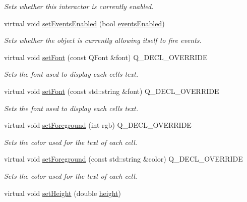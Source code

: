 \begin{DoxyCompactItemize}
\begin{DoxyCompactList}\small\item\em Sets whether this interactor is currently enabled. \end{DoxyCompactList}\item 
virtual void \mbox{\hyperlink{classGObservable_afaa30b2a9e0f378fd1c70d2f1d0b8216}{set\+Events\+Enabled}} (bool \mbox{\hyperlink{classGInteractor_ac05ba5b92e2e5146d416fe7f842a0969}{events\+Enabled}})
\begin{DoxyCompactList}\small\item\em Sets whether the object is currently allowing itself to fire events. \end{DoxyCompactList}\item 
virtual void \mbox{\hyperlink{classGTable_a2d22014c7fa3bccfd58c982aea1b55fa}{set\+Font}} (const Q\+Font \&font) Q\+\_\+\+D\+E\+C\+L\+\_\+\+O\+V\+E\+R\+R\+I\+DE
\begin{DoxyCompactList}\small\item\em Sets the font used to display each cell\textquotesingle{}s text. \end{DoxyCompactList}\item 
virtual void \mbox{\hyperlink{classGTable_ab39ef411fb13a52852ddd138c5932e2e}{set\+Font}} (const std\+::string \&font) Q\+\_\+\+D\+E\+C\+L\+\_\+\+O\+V\+E\+R\+R\+I\+DE
\begin{DoxyCompactList}\small\item\em Sets the font used to display each cell\textquotesingle{}s text. \end{DoxyCompactList}\item 
virtual void \mbox{\hyperlink{classGTable_af9227e80cbfac55ce936fa5c99ffc954}{set\+Foreground}} (int rgb) Q\+\_\+\+D\+E\+C\+L\+\_\+\+O\+V\+E\+R\+R\+I\+DE
\begin{DoxyCompactList}\small\item\em Sets the color used for the text of each cell. \end{DoxyCompactList}\item 
virtual void \mbox{\hyperlink{classGTable_a088e04dfc56273df4cedab2b11b970f5}{set\+Foreground}} (const std\+::string \&color) Q\+\_\+\+D\+E\+C\+L\+\_\+\+O\+V\+E\+R\+R\+I\+DE
\begin{DoxyCompactList}\small\item\em Sets the color used for the text of each cell. \end{DoxyCompactList}\item 
virtual void \mbox{\hyperlink{classGInteractor_a9e280bfc4544dfaf8e4376c4e1a74357}{set\+Height}} (double \mbox{\hyperlink{classGTable_ad3774f6419003470f54fd495124ef51f}{height}})

\end{DoxyCompactItemize}
